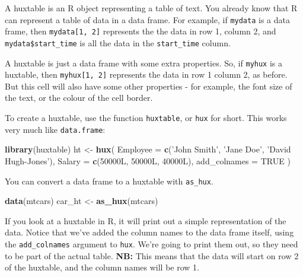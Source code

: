 \documentclass[]{article}
\newenvironment{Shaded}{\begin{snugshade}}{\end{snugshade}}
\newcommand{\DataTypeTok}[1]{\textcolor[rgb]{0.13,0.29,0.53}{#1}}
\newcommand{\KeywordTok}[1]{\textcolor[rgb]{0.13,0.29,0.53}{\textbf{#1}}}
\newcommand{\NormalTok}[1]{#1}
\newcommand{\OtherTok}[1]{\textcolor[rgb]{0.56,0.35,0.01}{#1}}
\newcommand{\StringTok}[1]{\textcolor[rgb]{0.31,0.60,0.02}{#1}}
\begin{document}
A huxtable is an R object representing a table of text. You already know
that R can represent a table of data in a data frame. For example, if
\texttt{mydata} is a data frame, then \texttt{mydata{[}1,\ 2{]}}
represents the the data in row 1, column 2, and
\texttt{mydata\$start\_time} is all the data in the \texttt{start\_time}
column.

A huxtable is just a data frame with some extra properties. So, if
\texttt{myhux} is a huxtable, then \texttt{myhux{[}1,\ 2{]}} represents
the data in row 1 column 2, as before. But this cell will also have some
other properties - for example, the font size of the text, or the colour
of the cell border.

To create a huxtable, use the function \texttt{huxtable}, or
\texttt{hux} for short. This works very much like \texttt{data.frame}:

\begin{Shaded}
\begin{Highlighting}[]
\KeywordTok{library}\NormalTok{(huxtable)}
\NormalTok{ht <-}\StringTok{ }\KeywordTok{hux}\NormalTok{(}
        \DataTypeTok{Employee     =} \KeywordTok{c}\NormalTok{(}\StringTok{'John Smith'}\NormalTok{, }\StringTok{'Jane Doe'}\NormalTok{, }\StringTok{'David Hugh-Jones'}\NormalTok{), }
        \DataTypeTok{Salary       =} \KeywordTok{c}\NormalTok{(50000L, 50000L, 40000L),}
        \DataTypeTok{add_colnames =} \OtherTok{TRUE}
\NormalTok{      )}
\end{Highlighting}
\end{Shaded}

\FloatBarrier

You can convert a data frame to a huxtable with \texttt{as\_hux}.

\begin{Shaded}
\begin{Highlighting}[]
\KeywordTok{data}\NormalTok{(mtcars)}
\NormalTok{car_ht <-}\StringTok{ }\KeywordTok{as_hux}\NormalTok{(mtcars)}
\end{Highlighting}
\end{Shaded}

\FloatBarrier

If you look at a huxtable in R, it will print out a simple
representation of the data. Notice that we've added the column names to
the data frame itself, using the \texttt{add\_colnames} argument to
\texttt{hux}. We're going to print them out, so they need to be part of
the actual table. \textbf{NB:} This means that the data will start on
row 2 of the huxtable, and the column names will be row 1.
\end{document}
